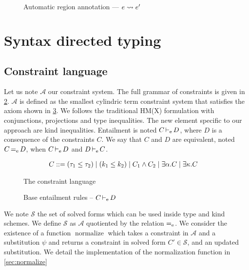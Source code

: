 \begin{figure*}[!hbt]
  \centering
  
  \caption{Automatic region annotation --- $e \rightsquigarrow e'$}
  \label{fig:region-annotation}
\end{figure*}

\section{Syntax directed typing}
\label{appendix:sdtyping}

\subsection{Constraint language}

\newcommand\A{\mathcal A}
\newcommand\SC{\mathcal S}

Let us note $\A$ our constraint system. The full grammar of constraints is
given in \cref{grammar:constraint}.
$\A$ is defined as the smallest cylindric term constraint system that
satisfies the axiom shown in \cref{rules:entail}.
We follows the traditional HM(X) formulation
with conjunctions, projections and type inequalities.
The new element specific to our approach are kind inequalities.
Entailment is noted $C \operatorname{\vdash_e} D$, where $D$ is a consequence of the
constraints $C$.
We say that $C$ and $D$ are equivalent, noted $C \operatorname{=_e} D$,
when $C \operatorname{\vdash_e} D$ and $D \operatorname{\vdash_e} C$.

\begin{figure}[tp]
  \centering
  \begin{align*}
    C &::= (\tau_1 \leq \tau_2)
        \mid (k_1 \leq k_2)
        \mid C_1 \wedge C_2
        \mid \exists \alpha.C
        \mid \exists \kappa.C
  \end{align*}
  \caption{The constraint language}
  \label{grammar:constraint}
\end{figure}

\begin{figure*}[tp]
  
  \caption{Lattice inequalities -- $k \lk_\Lat k'$}
  
  \caption{Base entailment rules -- $C \operatorname{\vdash_e} D$ }
  \label{rules:entail}
\end{figure*}


We note $\SC$ the set of solved forms
which can be used inside type and kind schemes.
We define $\SC$ as $\A$ quotiented by the relation $\operatorname{=_e}$.
%
We consider the existence of a function $\operatorname{normalize}$ which takes
a constraint in $\A$ and a substitution $\psi$ and returns a constraint
in solved form $C' \in \SC$,
and an updated substitution. We detail the implementation
of the normalization function in \cref{sec:normalize}

